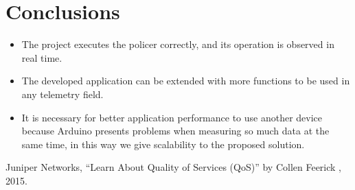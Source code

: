 \documentclass[conference]{IEEEtran}
\begin{document}
\section{Conclusions}
\begin{itemize}
	\item The project executes the policer correctly, and its operation is observed in real time.
	\item The developed application can be extended with more functions to be used in any telemetry field.
  \item It is necessary for better application performance to use another device because Arduino presents problems when measuring so much data at the same time, in this way we give scalability to the proposed solution.
\end{itemize}


\begin{thebibliography}{00}
  Juniper Networks, ``Learn About Quality of Services (QoS)'' by Collen Feerick , 2015.

\end{thebibliography}
\end{document}
